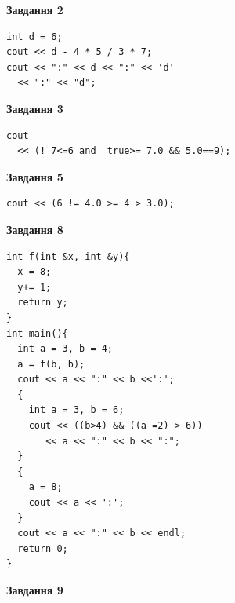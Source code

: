 \documentclass[12pt, ukrainian]{article}
\begin{document}
{\begin {large}
\begin{minipage}[t]{7.0cm}
\end{minipage}
\vline \hspace{1mm}
\begin{minipage}[t]{11.0cm}

\begin{center}
\textbf{Завдання 2}
\end{center}
\vspace{-8mm}

\begin{verbatim}
int d = 6;
cout << d - 4 * 5 / 3 * 7;
cout << ":" << d << ":" << 'd' 
  << ":" << "d";
\end{verbatim}



\begin{center}
\textbf{Завдання 3}
\end{center}
\vspace{-8mm}

\begin{verbatim}
cout 
  << (! 7<=6 and  true>= 7.0 && 5.0==9);
\end{verbatim}



\begin{center}
\textbf{Завдання 5}
\end{center}
\vspace{-8mm}

\begin{verbatim}
cout << (6 != 4.0 >= 4 > 3.0);
\end{verbatim}



\begin{center}
\textbf{Завдання 8}
\end{center}
\vspace{-8mm}

\begin{verbatim}
int f(int &x, int &y){
  x = 8;
  y+= 1;
  return y;
}
int main(){
  int a = 3, b = 4;
  a = f(b, b);
  cout << a << ":" << b <<':';
  {
    int a = 3, b = 6;
    cout << ((b>4) && ((a-=2) > 6))
       << a << ":" << b << ":";
  }
  {
    a = 8;
    cout << a << ':';
  }
  cout << a << ":" << b << endl;
  return 0;
}
\end{verbatim}

\end{minipage}


\begin{minipage}[t]{7.0cm}

\begin{center}
\textbf{Завдання 9}
\end{center}
\vspace{-8mm}


\end{minipage}
\end{large}}
\end{document}
